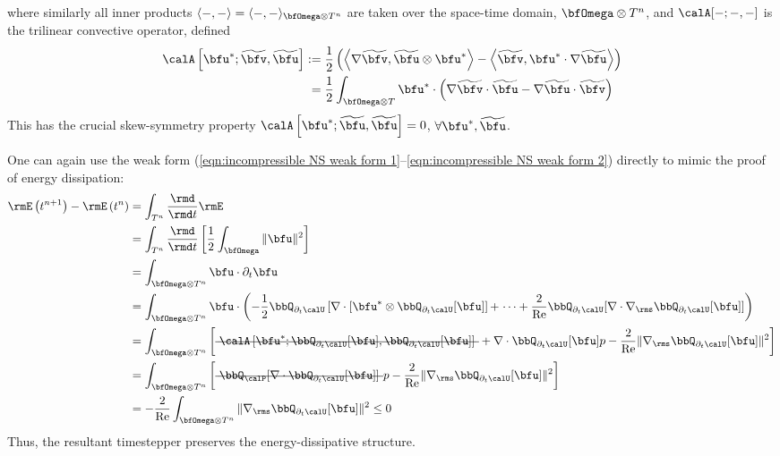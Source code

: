     where similarly all inner products $\langle -, -\rangle  =  \langle -, -\rangle_{\bfOmega\otimes T^{n}}$ are taken over the space-time domain, $\bfOmega\otimes T^{n}$, and $\calA[-; -, -]$ is the trilinear convective operator, defined
    \begin{align}
        \calA\left[\bfu^{*}; \widetilde{\bfv}, \widetilde{\bfu}\right]  :=  &\;\frac{1}{2}\left(\left\langle\nabla\widetilde{\bfv}, \widetilde{\bfu}\otimes\bfu^{*}\right\rangle - \left\langle\widetilde{\bfv}, \bfu^{*}\cdot\nabla\widetilde{\bfu}\right\rangle\right)  \label{eqn:convective operator definition}  \\
                                                                         =  &\;\frac{1}{2}\int_{\bfOmega\otimes T}\bfu^{*}\cdot\left(\nabla\widetilde{\bfv}\cdot\widetilde{\bfu} - \nabla\widetilde{\bfu}\cdot\widetilde{\bfv}\right)
    \end{align}
    This has the crucial skew-symmetry property $\calA\left[\bfu^{*}; \widetilde{\bfu}, \widetilde{\bfu}\right]  =  0$, $\forall \bfu^{*}, \widetilde{\bfu}$.

    \begin{remark}
    \end{remark}

    One can again use the weak form (\ref{eqn:incompressible NS weak form 1}--\ref{eqn:incompressible NS weak form 2}) directly to mimic the proof of energy dissipation:
    \begin{align}
        \rmE\left(t^{n + 1}\right) - \rmE\left(t^{n}\right)  &=  \int_{T^{n}}\frac{\rmd}{\rmd t}\rmE  \\
        &=  \int_{T^{n}}\frac{\rmd}{\rmd t}\left[\frac{1}{2}\int_{\bfOmega}\|\bfu\|^{2}\right]  \\
        &=  \int_{\bfOmega\otimes T^{n}}\bfu\cdot\partial_{t}\bfu  \\
        &=  \int_{\bfOmega\otimes T^{n}}\bfu\cdot\left(- \frac{1}{2}\bbQ_{\partial_{t}\calU}\left[\nabla\cdot\left[\bfu^{*}\otimes\bbQ_{\partial_{t}\calU}[\bfu]\right] + \right. \cdots + \frac{2}{\rmRe}\bbQ_{\partial_{t}\calU}[\nabla\cdot\nabla_{\rms}\bbQ_{\partial_{t}\calU}[\bfu]]\right)  \\
        &=  \int_{\bfOmega\otimes T^{n}}\left[\mst{\calA\left[\bfu^{*}; \bbQ_{\partial_{t}\calU}[\bfu], \bbQ_{\partial_{t}\calU}[\bfu]\right]} + \nabla\cdot\bbQ_{\partial_{t}\calU}[\bfu]p - \frac{2}{\rmRe}\|\nabla_{\rms}\bbQ_{\partial_{t}\calU}[\bfu]\|^{2}\right]  \\
        &=  \int_{\bfOmega\otimes T^{n}}\left[\mst{\bbQ_{\calP}[\nabla\cdot\bbQ_{\partial_{t}\calU}[\bfu]]}p - \frac{2}{\rmRe}\|\nabla_{\rms}\bbQ_{\partial_{t}\calU}[\bfu]\|^{2}\right]  \\
        &=  - \frac{2}{\rmRe}\int_{\bfOmega\otimes T^{n}}\|\nabla_{\rms}\bbQ_{\partial_{t}\calU}[\bfu]\|^{2}  \leq  0
    \end{align}
    Thus, the resultant timestepper preserves the energy-dissipative structure.


